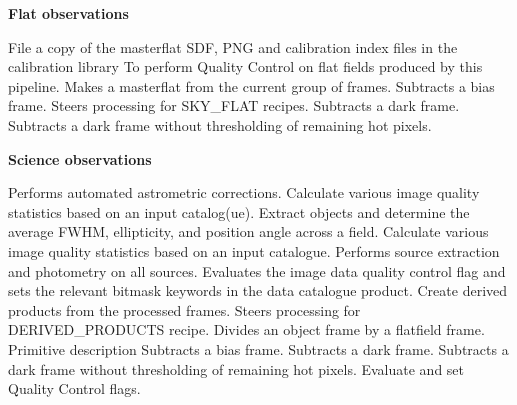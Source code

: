 \documentclass[twoside,11pt,nolof]{starlink}
\begin{document}
\begin{small}
{\large
\begin{center}
\textbf{Flat observations}

\end{center}
}
\begin{description}
File a copy of the masterflat SDF, PNG and calibration index files in the
calibration library
To perform Quality Control on flat fields produced by this pipeline.
Makes a masterflat from the current group of frames.
Subtracts a bias frame.
Steers processing for SKY\_FLAT recipes.
Subtracts a dark frame.
Subtracts a dark frame without thresholding of remaining hot pixels.
\end{description}

{\large
\begin{center}
\textbf{Science observations}
\end{center}
}
\begin{description}
Performs automated astrometric corrections.
Calculate various image quality statistics based on an input catalog(ue).
Extract objects and determine the average FWHM, ellipticity, and position angle across a field.
Calculate various image quality statistics based on an input catalogue.
Performs source extraction and photometry on all sources.
Evaluates the image data quality control flag and sets the relevant bitmask keywords in the data catalogue product.
Create derived products from the processed frames.
Steers processing for DERIVED\_PRODUCTS recipe.
Divides an object frame by a flatfield frame.
Primitive description
Subtracts a bias frame.
Subtracts a dark frame.
Subtracts a dark frame without thresholding of remaining hot pixels.
Evaluate and set Quality Control flags.
\end{description}


\end{small}
\end{document}
